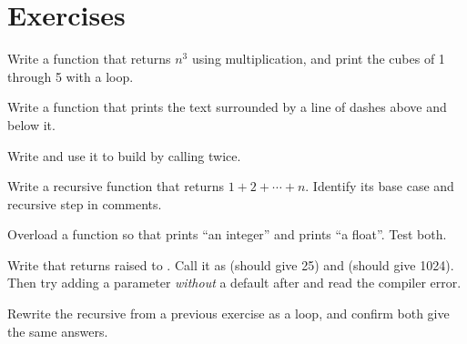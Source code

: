 \section{Exercises}

\exercise Write a function  that returns $n^3$ using
multiplication, and print the cubes of 1 through 5 with a loop.

\exercise Write a  function  that prints the
text surrounded by a line of dashes above and below it.

\exercise Write  and use it to build
 by calling  twice.

\exercise Write a recursive function  that returns
$1 + 2 + \cdots + n$. Identify its base case and recursive step in comments.

\exercise Overload a function  so that  prints
``an integer'' and  prints ``a float''. Test both.

\exercise Write  that returns
 raised to . Call it as  (should give 25) and
 (should give 1024). Then try adding a parameter \emph{without}
a default after  and read the compiler error.

\exercise Rewrite the recursive  from a previous exercise as a loop,
and confirm both give the same answers.
